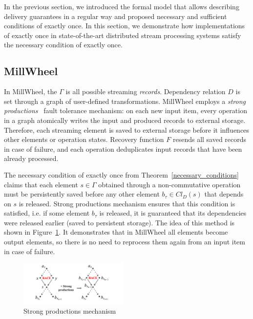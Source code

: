 \label{fs-eo-impl}

In the previous section, we introduced the formal model that allows describing delivery guarantees in a regular way and proposed necessary and sufficient conditions of exactly once. In this section, we demonstrate how implementations of exactly once in state-of-the-art distributed stream processing systems satisfy the necessary condition of exactly once. 

\subsection{MillWheel}

In MillWheel, the $\Gamma$ is all possible streaming {\em records}. Dependency relation $D$ is set through a graph of user-defined transformations. MillWheel employs a {\em strong productions}~\cite{Akidau:2013:MFS:2536222.2536229} fault tolerance mechanism: on each new input item, every operation in a graph atomically writes the input and produced records to external storage. Therefore, each streaming element is saved to external storage before it influences other elements or operation states. Recovery function $F$ resends all saved records in case of failure, and each operation deduplicates input records that have been already processed.

The necessary condition of exactly once from Theorem~\ref{necessary_conditions} claims that each element $s \in \Gamma$ obtained through a non-commutative operation must be persistently saved before any other element $b_{\tau} \in Cl_D(s)$ that depends on $s$ is released. Strong productions mechanism ensures that this condition is satisfied, i.e. if some element $b_\tau$ is released, it is guaranteed that its dependencies were released earlier (saved to persistent storage). The idea of this method is shown in Figure~\ref{millwheel}. It demonstrates that in MillWheel all elements become output elements, so there is no need to reprocess them again from an input item in case of failure. 

\begin{figure}[htbp]
  \centering
  \includegraphics[width=0.48\textwidth]{pics/millwheel}
  \caption{Strong productions mechanism}
  \label{millwheel}
\end{figure}

